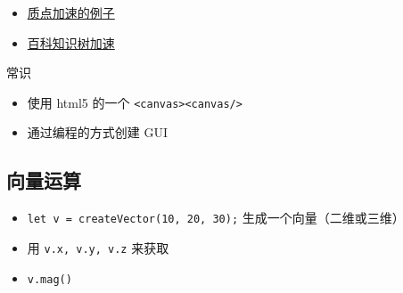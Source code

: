 
\begin{itemize}
\item \href{https://wuli.wiki/apps/PtAcc/}{质点加速的例子}
\item \href{https://wuli.wiki/apps/TwoBallSpring/}{百科知识树加速}
\end{itemize}

常识
\begin{itemize}
\item 使用 html5 的一个 \verb`<canvas><canvas/>`
\item 通过编程的方式创建 GUI
\end{itemize}

\subsection{向量运算}
\begin{itemize}
\item \verb`let v = createVector(10, 20, 30);` 生成一个向量（二维或三维）
\item 用 \verb`v.x, v.y, v.z` 来获取
\item \verb`v.mag()`
\end{itemize}


